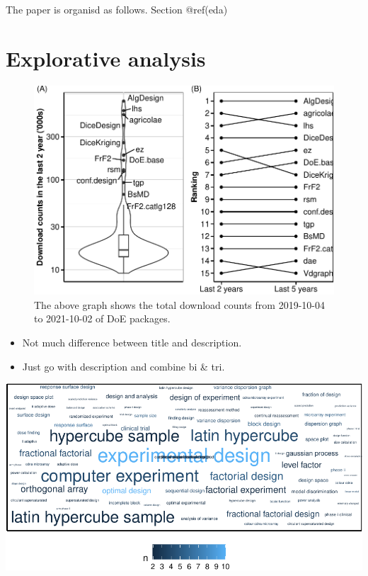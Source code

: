 The paper is organisd as follows. Section @ref(eda)

\hypertarget{eda}{%
\section{Explorative analysis}\label{eda}}

\begin{Schunk}
\begin{figure}[htbp]

{\centering \includegraphics{figures/dlplots-1} 

}

\caption[The above graph shows the total download counts from 2019-10-04 to 2021-10-02 of DoE packages]{The above graph shows the total download counts from 2019-10-04 to 2021-10-02 of DoE packages.}\label{fig:dlplots}
\end{figure}
\end{Schunk}

\begin{itemize}
\tightlist
\item
  Not much difference between title and description.
\item
  Just go with description and combine bi \& tri.
\end{itemize}

\begin{Schunk}


\begin{center}\includegraphics{figures/wordcloud-1} \end{center}

\end{Schunk}

